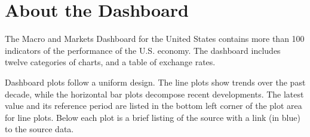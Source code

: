 \documentclass[final,a4paper]{report}
\begin{document}
\thispagestyle{main}
	
	\begin{minipage}{0.50\textwidth} 	\vspace{4mm}


	
		\small
		\section{\textcolor{blackdark}{About the Dashboard}}
		\vspace{-1mm}
		
		\small \normalfont
		The Macro and Markets Dashboard for the United States contains more than 100 indicators of the performance of the U.S. economy. The dashboard includes twelve categories of charts, and a table of exchange rates.  \hfill \vspace{4mm}
		
		Dashboard plots follow a uniform design. The line plots show trends over the past decade, while the horizontal bar plots decompose recent developments. The latest value and its reference period are listed in the bottom left corner of the plot area for line plots. Below each plot is a brief listing of the source with a link (in blue) to the source data. 

	\end{minipage}
\end{document}
